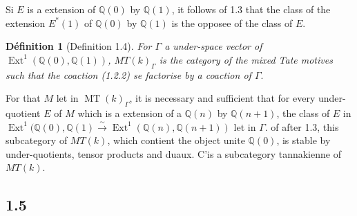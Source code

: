 \documentclass[11pt,a4paper]{article}
\theoremstyle{plain}
\theoremstyle{definition}
\newtheorem{definition}[theorem]{D\'efinition}
\theoremstyle{remark}
\DeclareMathOperator{\Ext}{Ext}
\DeclareMathOperator{\MT}{MT}
\newcommand{\dbQ}{\mathbb{Q}}
\newcommand{\simover}{\xrightarrow{\sim}}
\providecommand{\Ext}{\operatorname{Ext}}
\begin{document}
Si $E$ is a extension of $\dbQ(0)$ by
$\dbQ(1)$, it follows of 1.3 that the class
of the extension $E^*(1)$ of $\dbQ(0)$ by
$\dbQ(1)$ is the opposee of the class of $E$.

\begin{definition}[Definition 1.4]
{\it For $\Gamma$ a under-space vector of
$\Ext^1(\dbQ(0),\dbQ(1))$, 
$MT(k)_\Gamma$ is the category of the mixed Tate motives such that the coaction (1.2.2) se
factorise by a coaction of $\Gamma$}.
\end{definition}

For that $M$ let in $\MT(k)_\Gamma$, it is necessary and sufficient that for every under-quotient
$E$ of $M$ which is a extension of a
$\dbQ(n)$ by $\dbQ(n+1)$, the class of $E$
in 
$\Ext^1(\dbQ(0),\dbQ(1)\simover \Ext^1
(\dbQ(n),\dbQ(n+1))$
let in $\Gamma$. 
of after 1.3, this subcategory of
$MT(k)$, which contient the object unite $\dbQ(0)$,
is stable by under-quotients, tensor products and duaux.
C'is a subcategory tannakienne of
$MT(k)$.

\subsection*{1.5}
\end{document}
